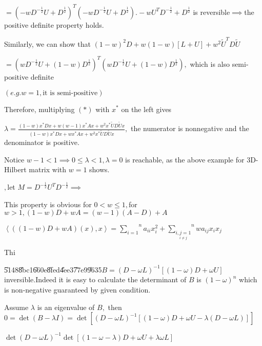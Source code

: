 \documentclass{article}
\begin{document}
$=\left( -wD^{-\frac{1}{2}}U+D^{\frac{1}{2}}\right) ^{T}\left( -wD^{-\frac{1%
}{2}}U+D^{\frac{1}{2}}\right) .-wU^{T}D^{-\frac{1}{2}}+D^{\frac{1}{2}}$ is
reversible$\implies $the positive definite property holds.

Similarly, we can show that $\left( 1-w\right) ^{2}D+w\left( 1-w\right) %
\left[ L+U\right] +w^{2}\tilde{U}^{T}D\tilde{U}$

$=\left( wD^{-\frac{1}{2}}U+\left( 1-w\right) D^{\frac{1}{2}}\right)
^{T}\left( wD^{-\frac{1}{2}}U+\left( 1-w\right) D^{\frac{1}{2}}\right) ,$%
which is also semi-positive definite

$\left( e.g.w=1,\text{it is semi-positive}\right) $

Therefore, multiplying $\left( \ast \right) $ with $x^{\ast }$ on the left
gives

$\lambda =\frac{\left( 1-w\right) x^{\ast }Dx+w\left( w-1\right) x^{\ast
}Ax+w^{2}x^{\ast }\tilde{U}D\tilde{U}x}{\left( 1-w\right) x^{\ast
}Dx+wx^{\ast }Ax+w^{2}x^{\ast }\tilde{U}D\tilde{U}x},$ the numerator is
nonnegative and the denominator is positive.

Notice $w-1<1\implies 0\leq \lambda <1,\lambda =0$ is reachable, as the
above example for 3D-Hilbert matrix with $w=1$ shows.

\bigskip 

$,$let $M=D^{-\frac{1}{2}}U^{T}D^{-\frac{1}{2}}\implies $

This property is obvious for $0<w\leq 1,$for $w>1,\left( 1-w\right)
D+wA=\left( w-1\right) \left( A-D\right) +A$

$\left\langle \left( \left( 1-w\right) D+wA\right) \left( x\right)
,x\right\rangle =\overset{n}{\underset{i=1}{\sum }}a_{ii}x_{i}^{2}+\overset{n%
}{\underset{\underset{i\neq j}{i,j=1}}{\sum }}wa_{ij}x_{i}x_{j}$

Thi


\U{5148}\U{8bc1}\U{660e}\U{8fed}\U{4ee3}\U{77e9}\U{9635}$B=\left( D-\omega
L\right) ^{-1}\left[ \left( 1-\omega \right) D+\omega U\right] $
inversible.Indeed it is easy to calculate the determinant of $B$ is $\left(
1-\omega \right) ^{n}$ which is non-negative guaranteed by given condition.

Assume $\lambda $ is an eigenvalue of $B,$ then $0=\det \left( B-\lambda
I\right) =\det \left[ \left( D-\omega L\right) ^{-1}\left[ \left( 1-\omega
\right) D+\omega U-\lambda \left( D-\omega L\right) \right] \right] $

$\det \left( D-\omega L\right) ^{-1}\det [\left( 1-\omega -\lambda \right)
D+\omega U+\lambda \omega L]$
\end{document}
